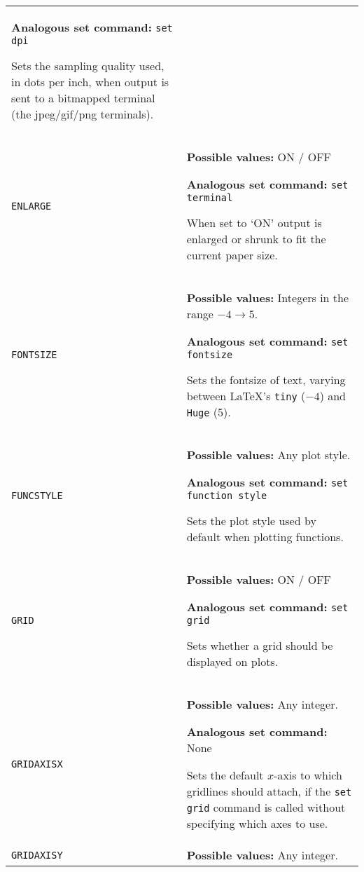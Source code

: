 \documentclass[a4paper,onecolumn,11pt]{book}
\begin{document}
\begin{longtable}{p{3.4cm}p{9cm}}
                   \textbf{Analogous set command:} \texttt{set dpi}\index{set dpi command@\texttt{set dpi} command}

                   Sets the sampling quality used, in dots per inch, when output is sent to a bitmapped terminal (the jpeg/gif/png terminals).
                   \\
\texttt{ENLARGE} & \textbf{Possible values:} ON / OFF

                   \textbf{Analogous set command:} \texttt{set terminal}\index{set terminal command@\texttt{set terminal} command}
                   
                   When set to `ON' output is enlarged or shrunk to fit the
                   current paper size.
                   \\

\texttt{FONTSIZE} & \textbf{Possible values:} Integers in the range $-4 \to 5$.

                   \textbf{Analogous set command:} \texttt{set fontsize}\index{set fontsize command@\texttt{set fontsize} command}

                   Sets the fontsize of text, varying between \LaTeX's \texttt{tiny} ($-4$) and \texttt{Huge} (5).
                   \\
\texttt{FUNCSTYLE} & \textbf{Possible values:} Any plot style.

                   \textbf{Analogous set command:} \texttt{set function style}\index{set function style command@\texttt{set function style} command}

                   Sets the plot style used by default when plotting functions.
                   \\
\texttt{GRID} & \textbf{Possible values:} ON / OFF

                   \textbf{Analogous set command:} \texttt{set grid}\index{set grid command@\texttt{set grid} command}

                   Sets whether a grid should be displayed on plots.
                   \\
\texttt{GRIDAXISX} & \textbf{Possible values:} Any integer.

                   \textbf{Analogous set command:} None

                   Sets the default $x$-axis to which gridlines should attach, if the \texttt{set grid} command is called without specifying which axes to use.
                   \\
\texttt{GRIDAXISY} & \textbf{Possible values:} Any integer.


\end{longtable}
\end{document}
